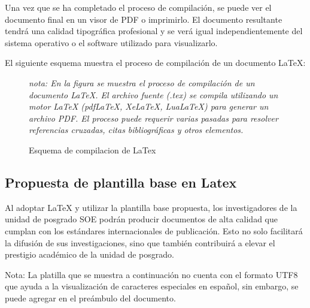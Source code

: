 \documentclass[12pt,twocolumn]{article}
\begin{document}
    Una vez que se ha completado el proceso de compilación, se puede ver el documento final en un visor de PDF o imprimirlo. El documento resultante tendrá una calidad tipográfica profesional y se verá igual independientemente del sistema operativo o el software utilizado para visualizarlo.


    El siguiente esquema muestra el proceso de compilación de un documento LaTeX:
    \begin{figure}[!ht]
    \caption{Esquema de compilacion de LaTex}
        \centering
        \label{fig:LatexD}
    \textit{nota: En la figura se muestra el proceso de compilación de un documento LaTeX. El archivo fuente (.tex) se compila utilizando un motor LaTeX (pdfLaTeX, XeLaTeX, LuaLaTeX) para generar un archivo PDF. El proceso puede requerir varias pasadas para resolver referencias cruzadas, citas bibliográficas y otros elementos.}
    \end{figure} 
    
    \subsection{Propuesta de plantilla base en Latex}
    Al adoptar LaTeX y utilizar la plantilla base propuesta, los investigadores de la unidad de posgrado SOE podrán producir documentos de alta calidad que cumplan con los estándares internacionales de publicación. 
    Esto no solo facilitará la difusión de sus investigaciones, sino que también contribuirá a elevar el prestigio académico de la unidad de posgrado.

    Nota: La platilla que se muestra a continuación no cuenta con el formato UTF8 que ayuda a la visualización de caracteres especiales en español, sin embargo, se puede agregar en el preámbulo del documento.
\end{document}
